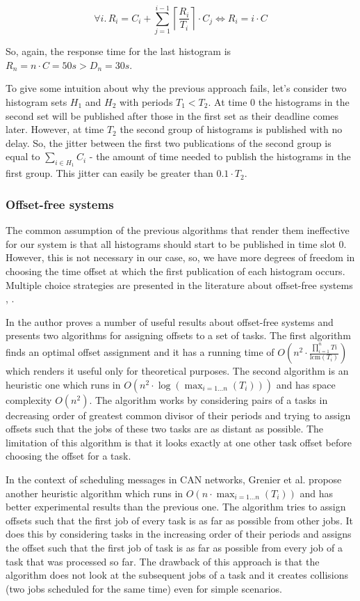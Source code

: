  $$ \forall i.\, R_i=C_i+\sum_{j=1}^{i-1} \left\lceil \frac{R_i}{T_i} \right\rceil \cdot C_j \Leftrightarrow R_i = i\cdot C$$
 
So, again, the response time for the last histogram is $R_n=n\cdot C=50s > D_n=30s$. 

To give some intuition about why the previous approach fails, let's consider two histogram sets $H_1$ and $H_2$ with periods $T_1 < T_2$. At time 0 the histograms in the second set will be published after those in the first set as their deadline comes later. However, at time $T_2$ the second group of histograms is published with no delay. So, the jitter between the first two publications of the second group is equal to $\sum_{i\in H_1} C_i$ - the amount of time needed to publish the histograms in the first group. This jitter can easily be greater than $0.1 \cdot T_2$. 

\subsubsection*{Offset-free systems} 

The common assumption of the previous algorithms that render them ineffective for our system is that all histograms should start to be published in time slot 0. However, this is not necessary in our case, so, we have more degrees of freedom in choosing the time offset at which the first publication of each histogram occurs. Multiple choice strategies are presented in the literature about offset-free systems \citep{goossens2003scheduling}, \citep{grenier2008pushing}.
 
In \citep{goossens2003scheduling} the author proves a number of useful results about offset-free systems and presents two algorithms for assigning offsets to a set of tasks. The first algorithm finds an optimal offset assignment and it has a running time of $O(n^2 \cdot \frac{\prod_{i=1}^n Ti}{\text{lcm}(T_i)})$ which renders it useful only for theoretical purposes. The second algorithm is an heuristic one which runs in $O(n^2\cdot \log(\max_{i=1\ldots n}(T_i)))$ and has space complexity $O(n^2)$. The algorithm works by considering pairs of a tasks in decreasing order of greatest common divisor of their periods and trying to assign offsets such that the jobs of these two tasks are as distant as possible. The limitation of this algorithm is that it looks exactly at one other task offset before choosing the offset for a task.

In the context of scheduling messages in CAN networks, Grenier et al. \citep{grenier2008pushing} propose another heuristic algorithm which runs in $O(n\cdot \max_{i=1 \ldots n}(T_i))$ and has better experimental results than the previous one. The algorithm tries to assign offsets such that the first job of every task is as far as possible from other jobs. It does this by considering tasks in the increasing order of their periods and assigns the offset such that the first job of task is as far as possible from every job of a task that was processed so far. The drawback of this approach is that the algorithm does not look at the subsequent jobs of a task and it creates collisions (two jobs scheduled for the same time) even for simple scenarios.

